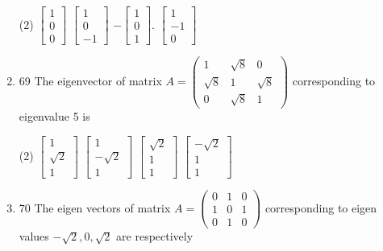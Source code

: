 \begin{enumerate}
  \begin{tasks}(2)
 	\task[\textbf{a.}]$\left[\begin{array}{l}1 \\ 0 \\ 0\end{array}\right]$
 	\task[\textbf{b.}]$\left[\begin{array}{c}1 \\ 0 \\ -1\end{array}\right]$
 	\task[\textbf{c.}]$-\left[\begin{array}{l}1 \\ 0 \\ 1\end{array}\right] .$
 	\task[\textbf{d.}] $\left[\begin{array}{c}1 \\ -1 \\ 0\end{array}\right]$
 \end{tasks}
 \item 69 The eigenvector of matrix $A=\left(\begin{array}{ccc}1 & \sqrt{8} & 0 \\ \sqrt{8} & 1 & \sqrt{8} \\ 0 & \sqrt{8} & 1\end{array}\right)$ corresponding to eigenvalue 5 is
  \begin{tasks}(2)
 	\task[\textbf{a.}]$\left[\begin{array}{c}1 \\ \sqrt{2} \\ 1\end{array}\right]$
 	\task[\textbf{b.}]$\left[\begin{array}{c}1 \\ -\sqrt{2} \\ 1\end{array}\right]$
 	\task[\textbf{c.}]$\left[\begin{array}{c}\sqrt{2} \\ 1 \\ 1\end{array}\right]$
 	\task[\textbf{d.}] $\left[\begin{array}{c}-\sqrt{2} \\ 1 \\ 1\end{array}\right]$
 \end{tasks}
 \item 70 The eigen vectors of matrix $A=\left(\begin{array}{lll}0 & 1 & 0 \\ 1 & 0 & 1 \\ 0 & 1 & 0\end{array}\right)$ corresponding to eigen values $-\sqrt{2}, 0, \sqrt{2}$ are respectively

\end{enumerate}

